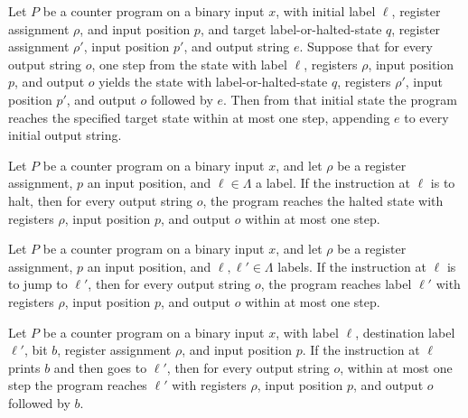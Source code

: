 \begin{theorem}
\label{Complexity.CounterProg.goes_of_step}
\leanok
{}
Let $P$ be a counter program on a binary input $x$, with initial label $\ell$, register
assignment $\rho$, and input position $p$, and target label-or-halted-state $q$,
register assignment $\rho'$, input position $p'$, and output string $e$. Suppose that
for every output string $o$, one step from the state with label $\ell$, registers
$\rho$, input position $p$, and output $o$ yields the state with label-or-halted-state
$q$, registers $\rho'$, input position $p'$, and output $o$ followed by $e$. Then from
that initial state the program reaches the specified target state within at most one
step, appending $e$ to every initial output string.
\end{theorem}

\begin{theorem}
\label{Complexity.CounterProg.goes_halt}
\leanok
{}
Let $P$ be a counter program on a binary input $x$, and let $\rho$ be a register
assignment, $p$ an input position, and $\ell\in\Lambda$ a label. If the instruction at
$\ell$ is to halt, then for every output string $o$, the program reaches the halted
state with registers $\rho$, input position $p$, and output $o$ within at most one step.
\end{theorem}

\begin{theorem}
\label{Complexity.CounterProg.goes_goto}
\leanok
{}
Let $P$ be a counter program on a binary input $x$, and let $\rho$ be a register
assignment, $p$ an input position, and $\ell,\ell'\in\Lambda$ labels. If the
instruction at $\ell$ is to jump to $\ell'$, then for every output string $o$, the
program reaches label $\ell'$ with registers $\rho$, input position $p$, and output $o$
within at most one step.
\end{theorem}

\begin{theorem}
\label{Complexity.CounterProg.goes_out}
\leanok
{}
Let $P$ be a counter program on a binary input $x$, with label $\ell$, destination label
$\ell'$, bit $b$, register assignment $\rho$, and input position $p$. If the instruction
at $\ell$ prints $b$ and then goes to $\ell'$, then for every output string $o$, within
at most one step the program reaches $\ell'$ with registers $\rho$, input position $p$,
and output $o$ followed by $b$.
\end{theorem}

